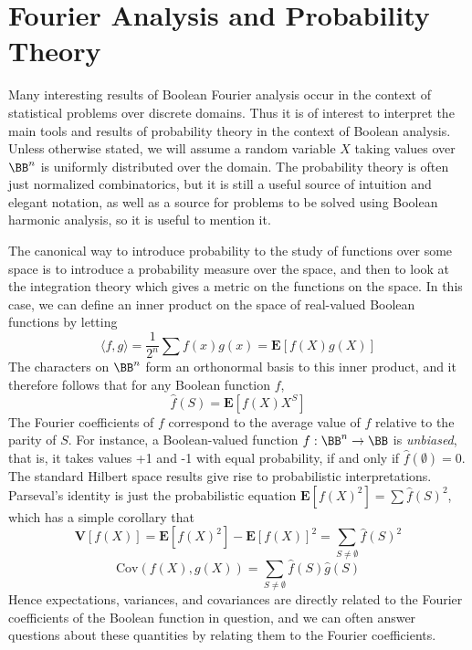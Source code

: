 \section{Fourier Analysis and Probability Theory}

Many interesting results of Boolean Fourier analysis occur in the context of statistical problems over discrete domains. Thus it is of interest to interpret the main tools and results of probability theory in the context of Boolean analysis. Unless otherwise stated, we will assume a random variable $X$ taking values over $\BB^n$ is uniformly distributed over the domain. The probability theory is often just normalized combinatorics, but it is still a useful source of intuition and elegant notation, as well as a source for problems to be solved using Boolean harmonic analysis, so it is useful to mention it.

The canonical way to introduce probability to the study of functions over some space is to introduce a probability measure over the space, and then to look at the integration theory which gives a metric on the functions on the space. In this case, we can define an inner product on the space of real-valued Boolean functions by letting
%
\[ \langle f, g \rangle = \frac{1}{2^n} \sum f(x)g(x) = \mathbf{E}[f(X)g(X)] \]
%
The characters on $\BB^n$ form an orthonormal basis to this inner product, and it therefore follows that for any Boolean function $f$,
%
\[ \widehat{f}(S) = \mathbf{E}[f(X)X^S] \]
%
The Fourier coefficients of $f$ correspond to the average value of $f$ relative to the parity of $S$. For instance, a Boolean-valued function $f: \BB^n \to \BB$ is {\it unbiased}, that is, it takes values +1 and -1 with equal probability, if and only if $\widehat{f}(\emptyset) = 0$. The standard Hilbert space results give rise to probabilistic interpretations. Parseval's identity is just the probabilistic equation $\mathbf{E}[f(X)^2] = \sum \widehat{f}(S)^2$, which has a simple corollary that
%
\[ \mathbf{V}[f(X)] = \mathbf{E}[f(X)^2] - \mathbf{E}[f(X)]^2 = \sum_{S \neq \emptyset} \widehat{f}(S)^2 \]
%
\[ \text{Cov}(f(X),g(X)) = \sum_{S \neq \emptyset} \widehat{f}(S) \widehat{g}(S) \]
%
Hence expectations, variances, and covariances are directly related to the Fourier coefficients of the Boolean function in question, and we can often answer questions about these quantities by relating them to the Fourier coefficients.

